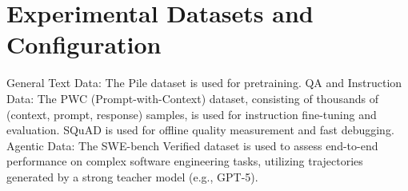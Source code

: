 \section{Experimental Datasets and Configuration}

General Text Data: The Pile dataset is used for pretraining.
QA and Instruction Data: The PWC (Prompt-with-Context) dataset, consisting of thousands of (context, prompt, response) samples, is used for instruction fine-tuning and evaluation.
SQuAD is used for offline quality measurement and fast debugging.
Agentic Data: The SWE-bench Verified dataset is used to assess end-to-end performance on complex software engineering tasks, utilizing trajectories generated by a strong teacher model (e.g., GPT-5).
